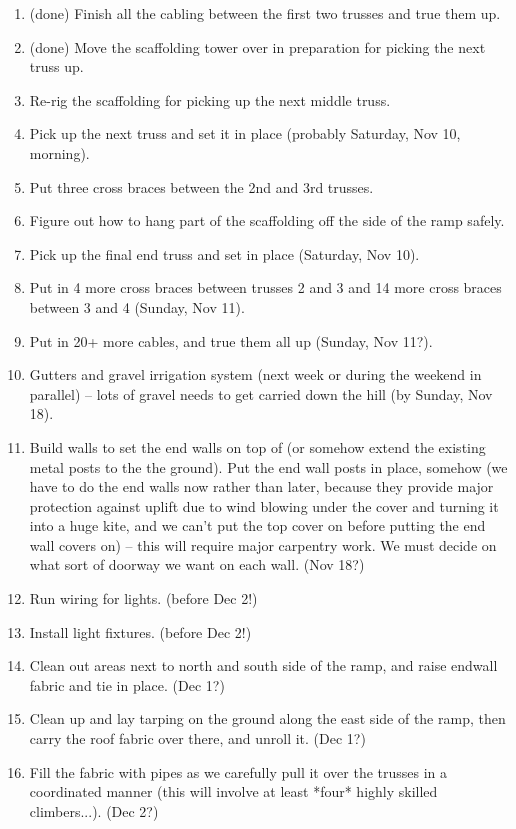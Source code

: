 \documentclass{article}
\begin{document}
\begin{enumerate}
\item (done) Finish all the cabling between the first two trusses and true them up.
\item (done) Move the scaffolding tower over in preparation for picking the next truss up.
\item Re-rig the scaffolding for picking up the next middle truss.
\item Pick up the next truss and set it in place (probably Saturday, Nov 10, morning).
\item Put three cross braces between the 2nd and 3rd trusses.
\item Figure out how to hang part of the scaffolding off the side of the ramp safely.
\item Pick up the final end truss and set in place (Saturday, Nov 10).
\item Put in 4 more cross braces between trusses 2 and 3 and 14 more cross braces between 3 and 4 (Sunday, Nov 11).
\item Put in 20+ more cables, and true them all up (Sunday, Nov 11?).
\item Gutters and gravel irrigation system (next week or during the weekend in parallel) -- lots of gravel needs to get carried down the hill (by Sunday, Nov 18).
\item Build walls to set the end walls on top of (or somehow extend the existing metal posts to the the ground). Put the end wall posts in place, somehow (we have to do the end walls now rather than later, because they provide major protection against uplift due to wind blowing under the cover and turning it into a huge kite, and we can't put the top cover on before putting the end wall covers on) -- this will require major carpentry work.  We must decide on what sort of doorway we want on each wall. (Nov 18?)
\item Run wiring for lights.    (before Dec 2!)
\item Install light fixtures.   (before Dec 2!)
\item Clean out areas next to north and south side of the ramp, and raise endwall fabric and tie in place. (Dec 1?)
\item Clean up and lay tarping on the ground along the east side of the ramp, then carry the roof fabric over there, and unroll it.  (Dec 1?)
\item Fill the fabric with pipes as we carefully pull it over the trusses in a coordinated manner (this will involve at least *four* highly skilled climbers...).  (Dec 2?)

\end{enumerate}
\end{document}
